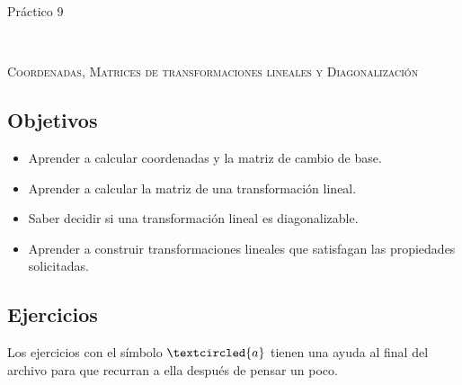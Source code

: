 \documentclass[12pt]{amsart}
\begin{document}



\centerline{\Large{Pr\' actico 9}}

\

\centerline{\textsc{Coordenadas, Matrices de transformaciones lineales y Diagonalizaci\'on}}

\subsection*{Objetivos}

\begin{itemize}
 \item Aprender a calcular coordenadas y la matriz de cambio de base.
 \item Aprender a calcular la matriz de una transformaci\'on lineal.
 \item Saber decidir si una transformaci\'on lineal es diagonalizable.
 \item Aprender a construir transformaciones lineales que satisfagan las propiedades solicitadas.
\end{itemize}


\bigbreak 


\subsection*{Ejercicios} Los ejercicios con el s\'imbolo $\textcircled{a}$ tienen una ayuda al final del archivo para que recurran a ella despu\'es de pensar un poco.
\end{document}
